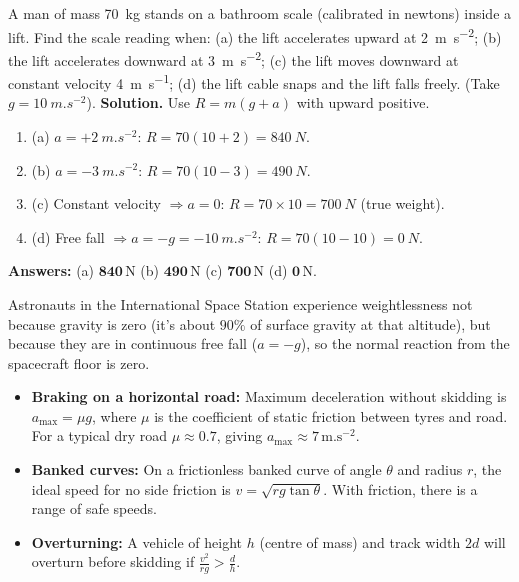 \documentclass[11pt]{article}
\begin{document}
\begin{exoresolu}
A man of mass \SI{70}{kg} stands on a bathroom scale (calibrated in newtons) inside a lift. Find the scale reading when: (a) the lift accelerates upward at \SI{2}{m.s^{-2}}; (b) the lift accelerates downward at \SI{3}{m.s^{-2}}; (c) the lift moves downward at constant velocity \SI{4}{m.s^{-1}}; (d) the lift cable snaps and the lift falls freely. (Take $g = \SI{10}{m.s^{-2}}$).
\tcblower
\textbf{Solution.}
Use $R = m(g + a)$ with upward positive.
\begin{enumerate}
    \item (a) $a = +\SI{2}{m.s^{-2}}$: $R = 70(10 + 2) = \SI{840}{N}$.
    \item (b) $a = -\SI{3}{m.s^{-2}}$: $R = 70(10 - 3) = \SI{490}{N}$.
    \item (c) Constant velocity $\Rightarrow a = 0$: $R = 70 \times 10 = \SI{700}{N}$ (true weight).
    \item (d) Free fall $\Rightarrow a = -g = -\SI{10}{m.s^{-2}}$: $R = 70(10 - 10) = \SI{0}{N}$.
\end{enumerate}
\textbf{Answers:} (a) $\boldsymbol{840\,\mathrm{N}}$ (b) $\boldsymbol{490\,\mathrm{N}}$ (c) $\boldsymbol{700\,\mathrm{N}}$ (d) $\boldsymbol{0\,\mathrm{N}}$.
\begin{savaistu}
Astronauts in the International Space Station experience weightlessness not because gravity is zero (it's about $90\%$ of surface gravity at that altitude), but because they are in continuous free fall ($a = -g$), so the normal reaction from the spacecraft floor is zero.
\end{savaistu}
\end{exoresolu}

\begin{experience}
\begin{itemize}
    \item \textbf{Braking on a horizontal road:} Maximum deceleration without skidding is $a_{\max} = \mu g$, where $\mu$ is the coefficient of static friction between tyres and road. For a typical dry road $\mu \approx 0.7$, giving $a_{\max} \approx 7\,\mathrm{m.s^{-2}}$.
    \item \textbf{Banked curves:} On a frictionless banked curve of angle $\theta$ and radius $r$, the ideal speed for no side friction is $v = \sqrt{rg\tan\theta}$. With friction, there is a range of safe speeds.
    \item \textbf{Overturning:} A vehicle of height $h$ (centre of mass) and track width $2d$ will overturn before skidding if $\frac{v^2}{rg} > \frac{d}{h}$.
\end{itemize}
\end{experience}
\end{document}
